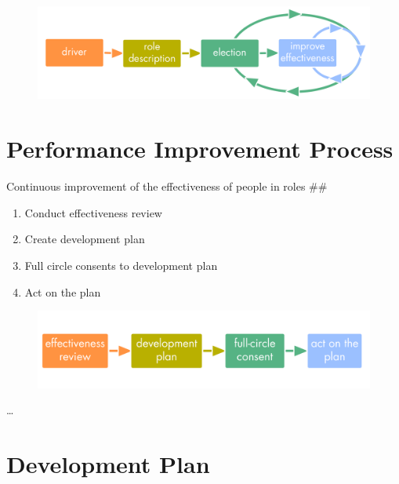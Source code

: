 \begin{figure}[htbp]
\centering
\includegraphics[keepaspectratio,width=\textwidth,height=0.75\textheight]{img/people-and-roles/role-improvement.png}
\end{figure}

\section{Performance Improvement Process}
\label{performanceimprovementprocess}

Continuous improvement of the effectiveness of people in roles \#\#

\begin{enumerate}
\item Conduct effectiveness review

\item Create development plan

\item Full circle consents to development plan

\item Act on the plan

\end{enumerate}

\begin{figure}[htbp]
\centering
\includegraphics[keepaspectratio,width=\textwidth,height=0.75\textheight]{img/people-and-roles/performance-improvement-process.png}
\end{figure}

{\ldots}

\section{Development Plan}
\label{developmentplan}

